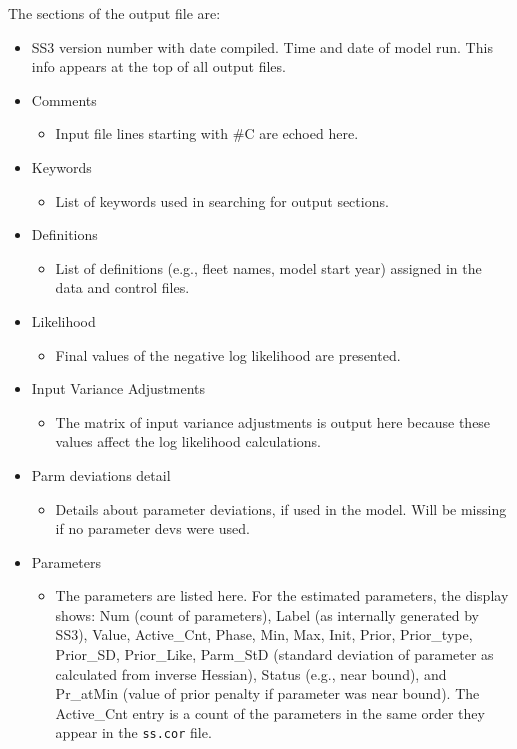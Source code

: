 The sections of the output file are:
\begin{itemize}
	\item SS3 version number with date compiled. Time and date of model run. This info appears at the top of all output files.
	\item Comments
		\begin{itemize}
			\item Input file lines starting with \#C are echoed here.
		\end{itemize}
	\item Keywords
		\begin{itemize}
			\item List of keywords used in searching for output sections.
		\end{itemize}
	\item Definitions
		\begin{itemize}
			\item List of definitions (e.g., fleet names, model start year) assigned in the data and control files.
		\end{itemize}
	\item Likelihood
		\begin{itemize}
			\item Final values of the negative log likelihood are presented.
		\end{itemize}
	\item Input Variance Adjustments
		\begin{itemize}
			\item The matrix of input variance adjustments is output here because these values affect the log likelihood calculations.
		\end{itemize}
	\item{Parm deviations detail}
	    \begin{itemize}
		    \item Details about parameter deviations, if used in the model. Will be missing if no parameter devs were used.
		\end{itemize}
	\item Parameters
		\begin{itemize}
			\item The parameters are listed here. For the estimated parameters, the display shows: Num (count of parameters), Label (as internally generated by SS3), Value, Active\_Cnt, Phase, Min, Max, Init, Prior, Prior\_type, Prior\_SD, Prior\_Like, Parm\_StD (standard deviation of parameter as calculated from inverse Hessian), Status (e.g., near bound), and Pr\_atMin (value of prior penalty if parameter was near bound). The Active\_Cnt entry is a count of the parameters in the same order they appear in the \texttt{ss.cor} file.

\end{itemize}
\end{itemize}
